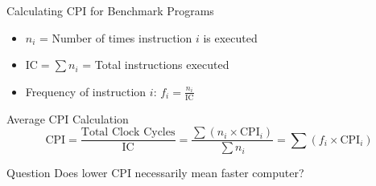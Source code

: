 \documentclass[aspectratio=169,12pt]{beamer}
\begin{document}
\begin{frame}{Calculating CPI for Benchmark Programs}
\begin{itemize}
    \item $n_i$ = Number of times instruction $i$ is executed
    \item $\text{IC} = \sum n_i$ = Total instructions executed
    \item Frequency of instruction $i$: $f_i = \frac{n_i}{\text{IC}}$
\end{itemize}

\begin{block}{Average CPI Calculation}
$$\text{CPI} = \frac{\text{Total Clock Cycles}}{\text{IC}} = \frac{\sum(n_i \times \text{CPI}_i)}{\sum n_i} = \sum(f_i \times \text{CPI}_i)$$
\end{block}

\begin{alertblock}{Question}
Does lower CPI necessarily mean faster computer?
\end{alertblock}

\end{frame}
\end{document}
